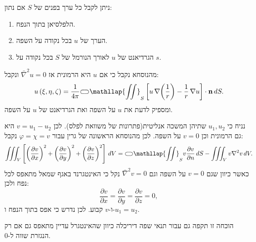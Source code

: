 \documentclass{tstextbook}
\begin{document}
\begin{corollary}
ניתן לקבל כל ערך בפנים של \(S\) אם נתון:

  \begin{enumerate}
    \item הלפלסיאן בתוך הנפח. 


    \item הערך של \(u\) בכל נקודה על השפה. 


    \item הגרדיאנט של \(u\) לאורך הנורמל של \(S\) בכל נקודה על \(s\). 


  \end{enumerate}
\end{corollary}
\begin{proposition}
מהנוסחא נקבל כי אם \(u\) היא הרמונית אז \(\bar{\nabla}^2u=0\)  ונקבל:
$$u\left( \xi,\eta,\zeta \right)=\frac{1}{4\pi}{\subset\!\supset} \mathllap{\iint}_{S}\left[u\,\nabla\!\left(\frac{1}{r}\right)-\frac{1}{r}\,\nabla u\right]\cdot\mathbf{n}\,d S.$$
ומספיק לדעת את \(u\) על השפה ואת הגרדיאנט של \(u\) על השפה. 

\end{proposition}
\begin{corollary}
נניח כי \(u_{1},u_{2}\) שתיהן המשכה אנליטית(פתרונות של משוואת לפלס). לכן \(v=u_{1}-u_{2}\) היא גם הרמונית וכן \(v=0\) על השפה. לכן מהנוסחא הראשונה של גרין עבור \(\varphi=\chi=v\) נקבל:
$$\iiint_{V}\left[\left({\frac{\partial v}{\partial x}}\right)^{2}+\left({\frac{\partial v}{\partial y}}\right)^{2}+\left({\frac{\partial v}{\partial z}}\right)^{2}\right]\,d V={\subset\!\supset} \mathllap{\iint}_{S}v{\frac{\partial v}{\partial n}}\,d S-\iiint_{V}v\nabla^{2}v\,d V.$$
כאשר כיוון שגם \(v=0\) על השפה וגם \(\bar{\nabla}^2v=0\) נקל כי האינטגרנד באגף שמאל מתאפס לכל נפח ולכן:
$${\frac{\partial v}{\partial x}}={\frac{\partial v}{\partial y}}={\frac{\partial v}{\partial z}}=0,$$
ו-\(v\) קבוע. לכן נדרש כי אפס בתוך הנפח ו-\(u_{1}=u_{2}\).

\end{corollary}
\begin{remark}
הוכחה זו תקפה גם עבור תנאי שפה דיריכלה כיוון שהאינטגרל עדיין מתאפס גם אם רק הנגזרת שווה ל-0.

\end{remark}
\end{document}
